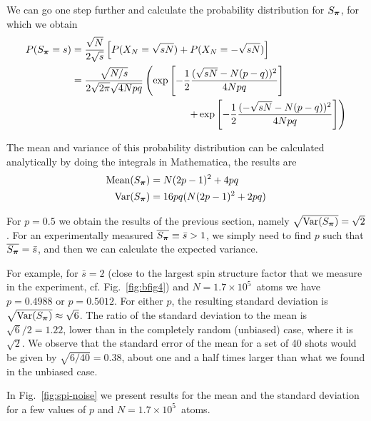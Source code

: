 We can go one step further and calculate the probability distribution for
$S_{\bm{\pi}}$, for which we obtain
\begin{equation}
\begin{split}
  P( S_{\bm{\pi}} = s ) & = \frac{\sqrt{N}}{2\sqrt{s}} 
     \left[ P( X_{N}=\sqrt{sN}) + P( X_{N}=-\sqrt{sN}) \right] \\
   & =
   \frac{\sqrt{N/s}}{2\sqrt{2\pi}\sqrt{4 N pq}}
   \left( 
    \exp\left[ -\frac{1}{2}\frac{(\sqrt{sN}-N(p-q))^{2}}{4 N pq }  \right] \right. \\ 
& ~~~~~~~~~~~~~~~~~~~~~~~~~~~~~~~~~~~ \left.
 +   \exp\left[ -\frac{1}{2}\frac{(-\sqrt{sN}-N(p-q))^{2}}{4 N pq }  \right]
   \right)
\end{split}
\label{eq:probSpi}
\end{equation}

The mean and variance of this probability distribution can be calculated
analytically by doing the integrals in Mathematica,  the results are
\begin{equation}
\begin{split} 
  \text{Mean}( S_{\bm{\pi}} ) & = N(2p-1)^{2} + 4pq \\ 
  \text{Var}( S_{\bm{\pi}} ) &  = 16pq( N(2p-1)^{2} + 2pq ) 
\end{split}
\end{equation}

For $p=0.5$ we obtain the results of the previous section, namely
$\sqrt{\text{Var}(S_{\bm{\pi}})}=\sqrt{2}$.  For an experimentally measured
$\overline{S_{\bm{\pi}}}\equiv \bar{s} > 1$, we simply need to find $p$ such
that $\overline{S_{\bm{\pi}}} = \bar{s}$,  and then we can calculate
the expected variance.   

For example,  for $\bar{s}=2$ (close to the largest spin structure factor that
we measure in the experiment, cf. Fig.~\ref{fig:bfig4}) and
$N=1.7\times10^{5}$~atoms  we have $p=0.4988$ or $p=0.5012$.   For either $p$,
the resulting standard deviation is
$\sqrt{\text{Var}(S_{\bm{\pi}})}\approx\sqrt{6}$.  The ratio of the standard
deviation to the mean is $\sqrt{6}/2=1.22$, lower than in the completely random
(unbiased) case, where it is $\sqrt{2}$.  We observe that the standard error of
the mean for a set of 40 shots would be given by  $\sqrt{6/40} = 0.38$,  about
one and a half times larger than what we found in the unbiased case.

In Fig.~\ref{fig:spi-noise} we present results for the mean and the standard
deviation for a few values of $p$ and $N =1.7\times10^{5}$~atoms.

